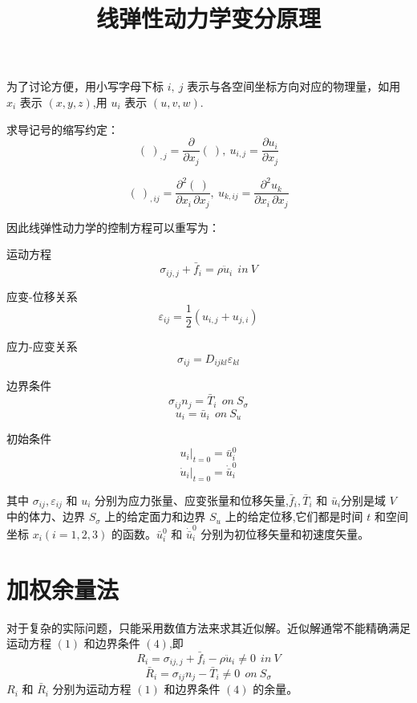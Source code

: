 \documentclass[12pt,a4paper]{article}
\title{线弹性动力学变分原理}
\date{\chntoday}
\begin{document}
\maketitle

为了讨论方便，用小写字母下标 $i,~j$ 表示与各空间坐标方向对应的物理量，如用 $x_i$ 表示 $(x, y, z)$,用 $u_i$ 表示 $(u, v, w)$.

求导记号的缩写约定：
$$(~)_{,j}=\frac{\partial}{\partial x_j}(~),~u_{i,j}=\frac{\partial u_i}{\partial x_j}$$

$$(~)_{,ij}=\frac{\partial^2 (~)}{\partial x_i\,\partial x_j},~u_{k,ij}=\frac{\partial^2 u_k}{\partial x_i\,\partial x_j}$$

因此线弹性动力学的控制方程可以重写为：

运动方程
\begin{equation}
\sigma_{ij,j}+\bar{f}_i=\rho\ddot{u}_i ~~in~V
\end{equation}

应变-位移关系
\begin{equation}
\varepsilon_{ij}=\frac{1}{2}(u_{i,j}+u_{j,i})
\end{equation}

应力-应变关系
\begin{equation}
\sigma_{ij}=D_{ijkl}\varepsilon_{kl}
\end{equation}

边界条件
\begin{equation}
\sigma_{ij}n_j=\bar{T}_i ~~on~S_{\sigma}
\end{equation}
\begin{equation}
u_i=\bar{u}_i ~~on~S_u 
\end{equation}

初始条件
\begin{equation}
u_i|_{t=0}=\bar{u}^0_i
\end{equation}
\begin{equation}
\dot{u}_i|_{t=0}=\dot{\bar{u}}^0_i
\end{equation}

其中 $\sigma_{ij},\varepsilon_{ij}$ 和 $u_i$ 分别为应力张量、应变张量和位移矢量,$\bar{f}_i,\bar{T}_i$ 和 $\bar{u}_i$分别是域 $V$ 中的体力、边界 $S_{\sigma}$ 上的给定面力和边界 $S_u$ 上的给定位移,它们都是时间 $t$ 和空间坐标 $x_i (i = 1, 2, 3)$ 的函数。$\bar{u}^0_i$ 和 $\dot{\bar{u}}^0_i$ 分别为初位移矢量和初速度矢量。

\section{加权余量法}
对于复杂的实际问题，只能采用数值方法来求其近似解。近似解通常不能精确满足运动方程 $(1)$ 和边界条件 $(4)$,即
\begin{equation}
R_i=\sigma_{ij,j}+\bar{f}_i-\rho\ddot{u}_i\ne 0 ~~in~V
\end{equation}
\begin{equation}
\bar{R}_i=\sigma_{ij}n_j-\bar{T}_i\ne 0 ~~on~S_{\sigma}
\end{equation}
$R_i$ 和 $\bar{R}_i$ 分别为运动方程 $(1)$ 和边界条件 $(4)$ 的余量。
\end{document}
